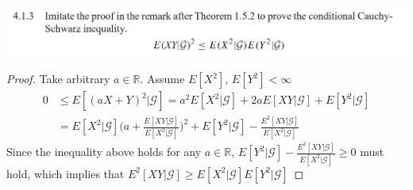 \documentclass[12pt, A4]{article}
\newcommand{\R}{\mathbb{R}}
\newcommand{\G}{\mathcal{G}}
\begin{document}
\includegraphics{Exer4.1.3.JPG}
\begin{proof}
	Take arbitrary $a\in \R$. Assume $E[X^2],\, E[Y^2]<\infty$
	\begin{align*}
		0&\leq E[(aX+Y)^2 |\G]=a^2E[X^2|\G]+2aE[XY|\G]+E[Y^2|\G]\\ &= E[X^2|\G]\Big(a+\frac{E[XY|\G]}{E[X^2|\G]} \Big)^2+E[Y^2|\G]-\frac{E^2[XY|\G]}{E[X^2|\G]}
	\end{align*}
	Since the inequality above holds for any $a\in \R$, $E[Y^2|\G]-\frac{E^2[XY|\G]}{E[X^2|\G]}\geq0$ must hold, which implies that $E^2[XY|\G]\geq E[X^2|\G]E[Y^2|\G]$
\end{proof}
\vspace{1cm}
\end{document}

